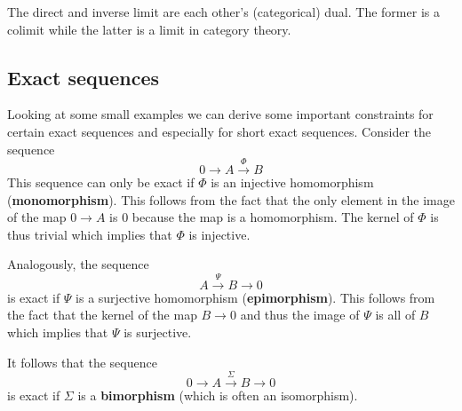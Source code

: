 	\begin{remark}
		The direct and inverse limit are each other's (categorical) dual. The former is a colimit while the latter is a limit in category theory.
	\end{remark}

\subsection{Exact sequences}

	
	
	\begin{property}
		Looking at some small examples we can derive some important constraints for certain exact sequences and especially for short exact sequences. Consider the sequence
		\[
			0\rightarrow A\xrightarrow{\Phi} B
		\]
		This sequence can only be exact if $\Phi$ is an injective homomorphism (\textbf{monomorphism}). This follows from the fact that the only element in the image of the map $0\rightarrow A$ is 0 because the map is a homomorphism. The kernel of $\Phi$ is thus trivial which implies that $\Phi$ is injective.
		
		Analogously, the sequence
		\[
			A\xrightarrow{\Psi}B\rightarrow0
		\]
		is exact if $\Psi$ is a surjective homomorphism (\textbf{epimorphism}). This follows from the fact that the kernel of the map $B\rightarrow0$ and thus the image of $\Psi$ is all of $B$ which implies that $\Psi$ is surjective.
		
		It follows that the sequence
		\[
			0\rightarrow A\xrightarrow{\Sigma}B\rightarrow0
		\]
		is exact if $\Sigma$ is a \textbf{bimorphism} (which is often an isomorphism).
	\end{property}

